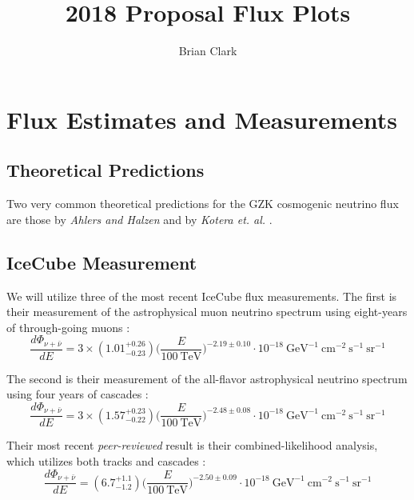 \documentclass[preprint,12pt]{article}
\begin{document}
\title{2018 Proposal Flux Plots}
\author{Brian Clark}

\maketitle

\section{Flux Estimates and Measurements}

\subsection{Theoretical Predictions}
Two very common theoretical predictions for the GZK cosmogenic neutrino flux are those by \textit{Ahlers and Halzen} \cite{Ahlers:2012rz} and by \textit{Kotera et. al.} \cite{Kotera:2010yn}.

\subsection{IceCube Measurement}


We will utilize three of the most recent IceCube flux measurements. The first is their measurement of the astrophysical muon neutrino spectrum using eight-years of through-going muons \cite{PoS(ICRC2017)1005}:
\begin{equation}
\frac{d \Phi _ {\nu + \bar{\nu}}}{d E} = 3 \times (1.01^{+0.26}_{-0.23}) \Bigg( \frac{E}{100~\textrm{TeV} } \Bigg) ^{-2.19 \pm 0.10} \cdot 10^{-18} ~\textrm{GeV}^{-1} ~\textrm{cm}^{-2} ~\textrm{s}^{-1} ~\textrm{sr}^{-1}
\end{equation}

The second is their measurement of the all-flavor astrophysical neutrino spectrum using four years of cascades \cite{PoS(ICRC2017)968}:
\begin{equation}
\frac{d \Phi _ {\nu + \bar{\nu}}}{d E} = 3 \times (1.57^{+0.23}_{-0.22}) \Bigg( \frac{E}{100~\textrm{TeV} } \Bigg) ^{-2.48 \pm 0.08} \cdot 10^{-18} ~\textrm{GeV}^{-1} ~\textrm{cm}^{-2} ~\textrm{s}^{-1} ~\textrm{sr}^{-1}
\end{equation}

Their most recent \textit{peer-reviewed} result is their combined-likelihood analysis, which utilizes both tracks and cascades \cite{Aartsen:2015knd}:
\begin{equation}
\frac{d \Phi _ {\nu + \bar{\nu}}}{d E} = (6.7^{+1.1}_{-1.2}) \Bigg( \frac{E}{100~\textrm{TeV} } \Bigg) ^{-2.50 \pm 0.09} \cdot 10^{-18} ~\textrm{GeV}^{-1} ~\textrm{cm}^{-2} ~\textrm{s}^{-1} ~\textrm{sr}^{-1}
\end{equation}
\end{document}
